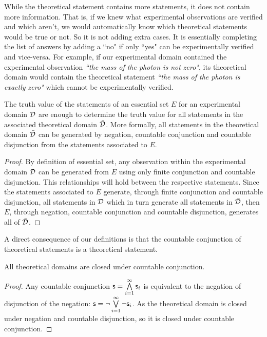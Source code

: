 \documentclass[11pt,letterpaper,fleqn]{memoir} %
\begin{document}
While the theoretical statement contains more statements, it does not contain more information. That is, if we knew what experimental observations are verified and which aren't, we would automatically know which theoretical statements would be true or not. So it is not adding extra cases. It is essentially completing the list of answers by adding a ``no" if only ``yes" can be experimentally verified and vice-versa. For example, if our experimental domain contained the experimental observation \emph{``the mass of the photon is not zero"}, its theoretical domain would contain the theoretical statement \emph{``the mass of the photon is exactly zero"} which cannot be experimentally verified.

\begin{mathSection}
\begin{prop}
	The truth value of the statements of an essential set $E$ for an experimental domain $\mathcal{D}$ are enough to determine the truth value for all statements in the associated theoretical domain $\bar{\mathcal{D}}$. More formally, all statements in the theoretical domain $\bar{\mathcal{D}}$ can be generated by negation, countable conjunction and countable disjunction from the statements associated to $E$.
\end{prop}

\begin{proof}
	By definition of essential set, any observation within the experimental domain $\mathcal{D}$ can be generated from $E$ using only finite conjunction and countable disjunction. This relationships will hold between the respective statements. Since the statements associated to $E$ generate, through finite conjunction and countable disjunction, all statements in $\mathcal{D}$ which in turn generate all statements in $\bar{\mathcal{D}}$, then $E$, through negation, countable conjunction and countable disjunction, generates all of $\bar{\mathcal{D}}$.
\end{proof}
\end{mathSection}

A direct consequence of our definitions is that the countable conjunction of theoretical statements is a theoretical statement.

\begin{mathSection}
	\begin{prop}
		All theoretical domains are closed under countable conjunction.
	\end{prop}

\begin{proof}
	Any countable conjunction $\mathsf{s} = \bigwedge\limits_{i=1}^{\infty} \mathsf{s}_i$ is equivalent to the negation of disjunction of the negation: $\mathsf{s} = \neg\bigvee\limits_{i=1}^{\infty} \neg\mathsf{s}_i$. As the theoretical domain is closed under negation and countable disjunction, so it is closed under countable conjunction.  
\end{proof}

\end{mathSection}
\end{document}
